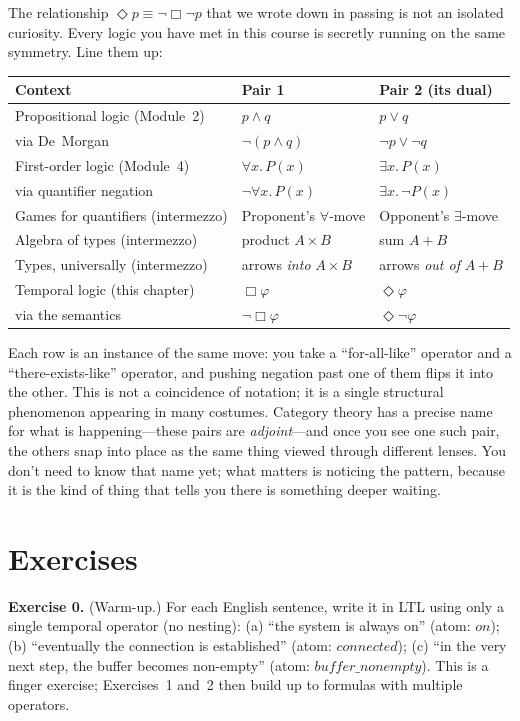 \documentclass[11pt]{article}
\begin{document}
The relationship $\Diamond p \equiv \lnot \Box \lnot p$ that we wrote down in passing is not an isolated curiosity. Every logic you have met in this course is secretly running on the same symmetry. Line them up:
\begin{center}
\begin{tabular}{lll}
\toprule
\textbf{Context} & \textbf{Pair 1} & \textbf{Pair 2 (its dual)} \\
\midrule
Propositional logic (Module~2) & $p \wedge q$ & $p \vee q$ \\
\qquad via De~Morgan & $\lnot(p \wedge q)$ & $\lnot p \vee \lnot q$ \\
First-order logic (Module~4) & $\forall x.\, P(x)$ & $\exists x.\, P(x)$ \\
\qquad via quantifier negation & $\lnot \forall x.\, P(x)$ & $\exists x.\, \lnot P(x)$ \\
Games for quantifiers (intermezzo) & Proponent's $\forall$-move & Opponent's $\exists$-move \\
Algebra of types (intermezzo) & product $A \times B$ & sum $A + B$ \\
Types, universally (intermezzo) & arrows \emph{into} $A \times B$ & arrows \emph{out of} $A + B$ \\
Temporal logic (this chapter) & $\Box \varphi$ & $\Diamond \varphi$ \\
\qquad via the semantics & $\lnot \Box \varphi$ & $\Diamond \lnot \varphi$ \\
\bottomrule
\end{tabular}
\end{center}

Each row is an instance of the same move: you take a ``for-all-like'' operator and a ``there-exists-like'' operator, and pushing negation past one of them flips it into the other. This is not a coincidence of notation; it is a single structural phenomenon appearing in many costumes. Category theory has a precise name for what is happening---these pairs are \emph{adjoint}---and once you see one such pair, the others snap into place as the same thing viewed through different lenses. You don't need to know that name yet; what matters is noticing the pattern, because it is the kind of thing that tells you there is something deeper waiting.

\section{Exercises}

\bigskip
\textbf{Exercise 0.}\label{ex:temp:0} (Warm-up.) For each English sentence, write it in LTL using only a single temporal operator (no nesting): (a) ``the system is always on'' (atom: $\mathit{on}$); (b) ``eventually the connection is established'' (atom: $\mathit{connected}$); (c) ``in the very next step, the buffer becomes non-empty'' (atom: $\mathit{buffer\_nonempty}$). This is a finger exercise; Exercises~1 and~2 then build up to formulas with multiple operators.
\end{document}
